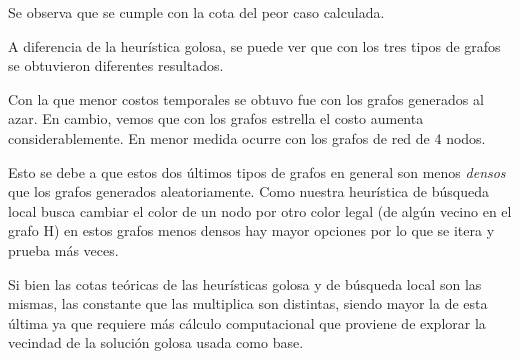 \quad

\quad Se observa que se cumple con la cota del peor caso calculada.

\quad A diferencia de la heurística golosa, se puede ver que con los tres tipos de grafos se obtuvieron diferentes resultados.

\quad Con la que menor costos temporales se obtuvo fue con los grafos generados al azar. En cambio, vemos que con los grafos estrella el costo aumenta considerablemente. En menor medida ocurre con los grafos de red de 4 nodos. 

\quad Esto se debe a que estos dos últimos tipos de grafos en general son menos \textit{densos} que los grafos generados aleatoriamente. Como nuestra heurística de búsqueda local busca cambiar el color de un nodo por otro color legal (de algún vecino en el grafo H) en estos grafos menos densos hay mayor opciones por lo que se itera y prueba más veces.

\quad Si bien las cotas teóricas de las heurísticas golosa y de búsqueda local son las mismas, las constante que las multiplica son distintas, siendo mayor la de esta última ya que requiere más cálculo computacional que proviene de explorar la vecindad de la solución golosa usada como base.
